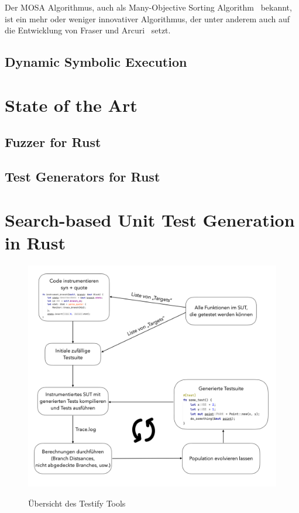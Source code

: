 \documentclass{article}
\begin{document}
Der MOSA Algorithmus, auch als Many-Objective Sorting Algorithm~\cite{Panichella_2015} bekannt, ist ein mehr oder weniger innovativer Algorithmus, der unter anderem auch auf die Entwicklung von Fraser und Arcuri~\cite{Fraser_2013} setzt. 
\subsection{Dynamic Symbolic Execution}


\section{State of the Art}
\subsection{Fuzzer for Rust}
\subsection{Test Generators for Rust}

\section{Search-based Unit Test Generation in Rust}
\begin{figure}[h]
\caption{Übersicht des Testify Tools}
\centering
\includegraphics[width=\textwidth]{testify-overview}
\label{fig:testify-overview}
\end{figure}
\end{document}
